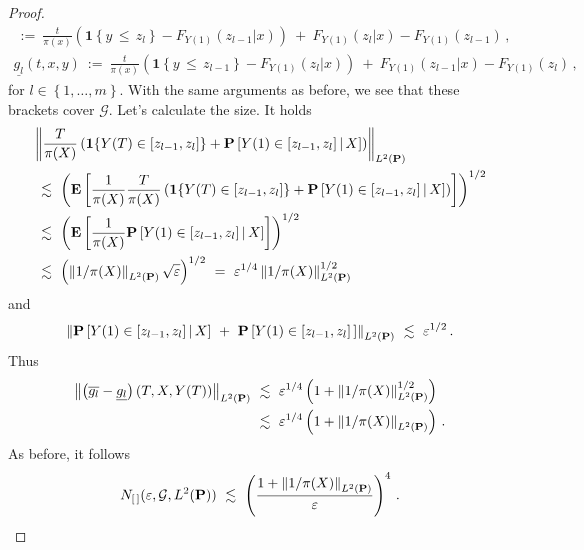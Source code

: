 \begin{proof}
\begin{align*}
    \ 
    :=
    \ 
    \frac{t}{\pi(x)}
    \left( 
      \mathbf{1}{\left\{  y\,\le\,z_{l} \right\}}
      -
      F_{Y(1)}(z_{l-1}|x)
    \right)
    \ 
    +
    \ 
    F_{Y(1)}(z_{l}|x)
-
F_{Y(1)}(z_{l-1})
\,,
\\
    \underline{g_l}
    (t,x,y)
    \ 
    :=
    \ 
    \frac{t}{\pi(x)}
    \left( 
      \mathbf{1}{\left\{  y\,\le\,z_{l-1} \right\}}
      -
      F_{Y(1)}(z_l|x)
    \right)
    \ 
    +
    \ 
    F_{Y(1)}(z_{l-1}|x)
-
      F_{Y(1)}(z_l)
\,,
  \end{align*}
  for $l\in \left\{ 1,\ldots,m \right\}$.
  With the same arguments as before, we see that these brackets cover $\mathcal{G}$.
  Let's calculate the size.
  It holds
  \begin{align*}
    &
    \norm{
      \frac{T}{\pi(X)}
      \left( 
      \mathbf{1}{
      \left\{ 
      Y(T)\in [z_{l-1},z_l] 
    \right\}
    }
      +
      \P
      \left[ 
      Y(1)\in [z_{l-1},z_l] 
      \,
      |
      \,
      X
      \right]
      \right)
    }_{ L^2(\P)}
    \\
    &
    \
    \lesssim
    \
    \left( 
      \E
      \left[ 
        \frac{1}{\pi(X)}
        \frac{T}{\pi(X)}
      \left( 
      \mathbf{1}{
      \left\{ 
      Y(T)\in [z_{l-1},z_l] 
    \right\}
    }
      +
      \P
      \left[ 
      Y(1)\in [z_{l-1},z_l] 
      \,
      |
      \,
      X
      \right]
      \right)
      \right]
    \right)
    ^{1/2}
    \\
    &
    \
    \lesssim
    \
    \left( 
      \E
      \left[ 
        \frac{1}{\pi(X)}
      \P
      \left[ 
      Y(1)\in [z_{l-1},z_l] 
      \,
      |
      \,
      X
      \right]
      \right]
    \right)
    ^{1/2}
    \\
    &
    \ 
    \lesssim
    \ 
    \left( 
      \norm{1/\pi(X)}_{ L^2(\P)}
      \sqrt{\varepsilon}
    \right)
    ^{1/2}
    \ 
    =
    \ 
    \varepsilon^{1/4}
    \norm{1/\pi(X)}_{ L^2(\P)}^{1/2}
  \end{align*}
  and
  \begin{align*}
     \norm{
      \P
      \left[ 
      Y(1)\in [z_{l-1},z_l] 
      \,
      |
      \,
      X
      \right]
      \ 
     + 
      \ 
      \P
      \left[ 
      Y(1)\in [z_{l-1},z_l] \,
      \right]
    }_{ L^2(\P)}
    \ 
    \lesssim
    \ 
    \varepsilon^{1/2}
    \,.
  \end{align*}
  Thus
  \begin{align*}
  \norm{
    \left( 
  \overline{g_l}
-
  \underline{g_l}
    \right)
  (T,X,Y(T))
}_
{ L^2(\P)}
    &
\ 
\lesssim
\ 
\varepsilon^{1/4}
\left( 
  1
  +
    \norm{1/\pi(X)}_{ L^2(\P)}^{1/2}
\right)
\\
    &
\ 
\lesssim
\ 
\varepsilon^{1/4}
\left( 
  1
  +
    \norm{1/\pi(X)}_{ L^2(\P)}
\right)
\,.
  \end{align*}
As before, it follows
\begin{gather*}
    N_{[\,]}
    (
    \varepsilon
    ,
    \mathcal{G}, L^2(\P))
    \ 
    \lesssim
    \ 
    \left( 
    \frac{
      1+
    \norm{1/\pi(X)}_{ L^2(\P)}
    }
    {\varepsilon}
    \right)^4
    \,.
\end{gather*}
\end{proof}

